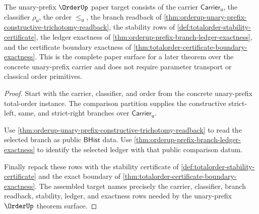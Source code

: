 \begin{theorem}
\label{thm:orderup-unary-prefix-audit-target-surface}
The unary-prefix $\OrderUp$ paper target consists of the carrier
$\mathsf{Carrier}_{\mathsf{u}}$, the classifier $\rho_{\mathsf{u}}$, the order
$\le_{\mathsf{u}}$, the branch readback of
\autoref{thm:orderup-unary-prefix-constructive-trichotomy-readback}, the
stability rows of \autoref{def:totalorder-stability-certificate}, the ledger
exactness of \autoref{thm:orderup-prefix-branch-ledger-exactness}, and the
certificate boundary exactness of
\autoref{thm:totalorder-certificate-boundary-exactness}. This is the complete
paper surface for a later theorem over the concrete unary-prefix carrier and
does not require parameter transport or classical order primitives.
\end{theorem}
\begin{proof}
Start with the carrier, classifier, and order from the concrete unary-prefix
total-order instance. The comparison partition supplies the constructive
strict-left, same, and strict-right branches over
$\mathsf{Carrier}_{\mathsf{u}}$.

Use \autoref{thm:orderup-unary-prefix-constructive-trichotomy-readback} to read
the selected branch as public $\mathsf{BHist}$ data. Use
\autoref{thm:orderup-prefix-branch-ledger-exactness} to identify the selected
ledger with that public comparison datum.

Finally repack these rows with the stability certificate of
\autoref{def:totalorder-stability-certificate} and the exact boundary of
\autoref{thm:totalorder-certificate-boundary-exactness}. The assembled target
names precisely the carrier, classifier, branch readback, stability, ledger,
and exactness rows needed by the unary-prefix $\OrderUp$ theorem surface.
\end{proof}

